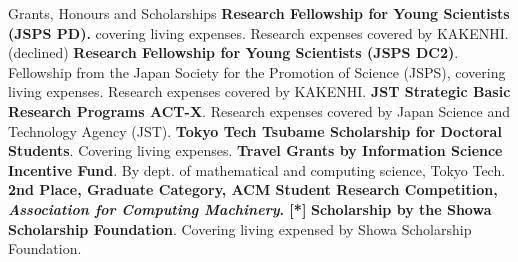 \begin{rubric}{Grants, Honours and Scholarships}
  \entry*[2023] \textbf{Research Fellowship for Young Scientists (JSPS PD).} covering
  living expenses. Research expenses covered by KAKENHI. (declined)
  \entry*[2021] \textbf{Research Fellowship for Young Scientists (JSPS DC2)}.
  Fellowship from the Japan Society for the Promotion of Science (JSPS), covering
  living expenses. Research expenses covered by KAKENHI.
  \entry*[2020] \textbf{JST Strategic Basic Research Programs ACT-X}. Research
  expenses covered by Japan Science and Technology Agency (JST).
  \entry*[2020] \textbf{Tokyo Tech Tsubame Scholarship for Doctoral
    Students}. Covering living expenses.
  \entry*[2019] \textbf{Travel Grants by Information Science Incentive Fund}. By
  dept. of mathematical and computing science, Tokyo Tech.
  \entry*[2019] \textbf{2nd Place, Graduate Category, ACM Student Research
    Competition, \textit{Association for Computing Machinery}. [*]}
  \entry*[2014] \textbf{Scholarship by the Showa Scholarship Foundation}. Covering
  living expensed by Showa Scholarship Foundation.
\end{rubric}
